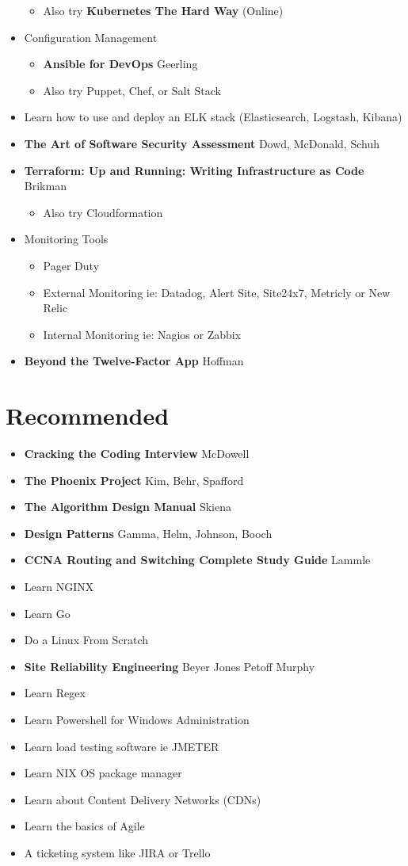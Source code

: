\documentclass[12pt]{article}
\begin{document}
\begin{itemize}
\begin{itemize}
  \item Also try \textbf{Kubernetes The Hard Way} (Online)
  \end{itemize}
\item Configuration Management
  \begin{itemize}
  \item \textbf{Ansible for DevOps} Geerling 
  \item Also try Puppet, Chef, or Salt Stack
  \end{itemize}
\item Learn how to use and deploy an ELK stack (Elasticsearch, Logstash, Kibana)
\item \textbf{The Art of Software Security Assessment} Dowd, McDonald, Schuh
\item \textbf{Terraform: Up and Running: Writing Infrastructure as Code}  Brikman
  \begin{itemize}
  \item Also try Cloudformation
  \end{itemize}
\item Monitoring Tools
  \begin{itemize}
  \item Pager Duty
  \item External Monitoring ie: Datadog, Alert Site, Site24x7,
    Metricly or New Relic
  \item Internal Monitoring ie: Nagios or Zabbix
  \end{itemize}
\item \textbf{Beyond the Twelve-Factor App} Hoffman
\end{itemize}

\section{Recommended}
\begin{itemize}
\item \textbf{Cracking the Coding Interview} McDowell
\item \textbf{The Phoenix Project} Kim, Behr, Spafford
\item \textbf{The Algorithm Design Manual} Skiena
\item \textbf{Design Patterns} Gamma, Helm, Johnson, Booch
\item \textbf{CCNA Routing and Switching Complete Study Guide} Lammle
\item Learn NGINX
\item Learn Go
\item Do a Linux From Scratch
\item \textbf{Site Reliability Engineering} Beyer Jones Petoff Murphy
\item Learn Regex
\item Learn Powershell for Windows Administration
\item Learn load testing software ie JMETER
\item Learn NIX OS package manager
\item Learn about Content Delivery Networks (CDNs)
\item Learn the basics of Agile
\item A ticketing system like JIRA or Trello
\end{itemize}
\end{document}

